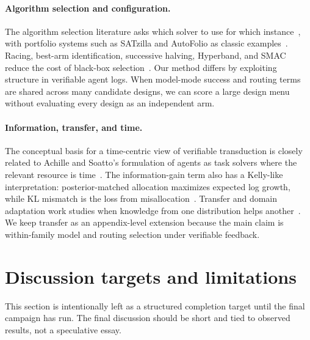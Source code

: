 \documentclass{article}
\newcounter{algorithm}
\begin{document}
\paragraph{Algorithm selection and configuration.}
The algorithm selection literature asks which solver to use for which instance~\citep{rice1976algorithm,kotthoff2016algorithm}, with portfolio systems such as SATzilla and AutoFolio as classic examples~\citep{xu2012satzilla,lindauer2015autofolio}.
Racing, best-arm identification, successive halving, Hyperband, and SMAC reduce the cost of black-box selection~\citep{maron1993hoeffding,maron1997racing,kaufmann2016bestarm,jamieson2016successive,li2017hyperband,hutter2011smac}.
Our method differs by exploiting structure in verifiable agent logs.
When model-mode success and routing terms are shared across many candidate designs, we can score a large design menu without evaluating every design as an independent arm.

\paragraph{Information, transfer, and time.}
The conceptual basis for a time-centric view of verifiable transduction is closely related to Achille and Soatto's formulation of agents as task solvers where the relevant resource is time~\citep{achille2025agents}.
The information-gain term also has a Kelly-like interpretation: posterior-matched allocation maximizes expected log growth, while KL mismatch is the loss from misallocation~\citep{kelly1956new,cover2006elements}.
Transfer and domain adaptation work studies when knowledge from one distribution helps another~\citep{bendavid2010theory,mansour2009domain,pan2010survey,achille2019task2vec,you2021logme,pandy2022transferability,wang2019negative}.
We keep transfer as an appendix-level extension because the main claim is within-family model and routing selection under verifiable feedback.

\section{Discussion targets and limitations}
\label{sec:discussion}

This section is intentionally left as a structured completion target until the final campaign has run.
The final discussion should be short and tied to observed results, not a speculative essay.
\end{document}
